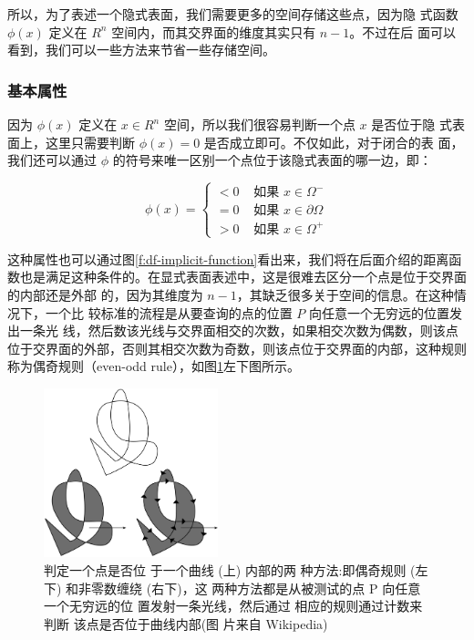 所以，为了表述一个隐式表面，我们需要更多的空间存储这些点，因为隐 式函数 $\phi({x})$ 定义在 $R^{n}$ 空间内，而其交界面的维度其实只有 $n − 1$。不过在后 面可以看到，我们可以一些方法来节省一些存储空间。




\subsubsection{基本属性}
因为 $\phi({x})$ 定义在 ${x} \in R^{n}$ 空间，所以我们很容易判断一个点 ${x}$ 是否位于隐 式表面上，这里只需要判断 $\phi({x}) = 0$ 是否成立即可。不仅如此，对于闭合的表 面，我们还可以通过 $\phi$ 的符号来唯一区别一个点位于该隐式表面的哪一边，即：

\begin{equation}
	\phi({x})=\begin{cases}
		<0 & \text{~如果~} {x}\in\Omega^{-}\\
		=0 & \text{~如果~} {x}\in\partial\Omega\\
		>0 & \text{~如果~} {x}\in\Omega^{+}
	\end{cases}
\end{equation}

这种属性也可以通过图\ref{f:df-implicit-function}看出来，我们将在后面介绍的距离函数也是满足这种条件的。在显式表面表述中，这是很难去区分一个点是位于交界面的内部还是外部 的，因为其维度为 $n − 1$，其缺乏很多关于空间的信息。在这种情况下，一个比 较标准的流程是从要查询的点的位置 $P$ 向任意一个无穷远的位置发出一条光 线，然后数该光线与交界面相交的次数，如果相交次数为偶数，则该点位于交界面的外部，否则其相交次数为奇数，则该点位于交界面的内部，这种规则称为偶奇规则（even-odd rule），如图\ref{f:df-non-zero_winding}左下图所示。

\begin{figure}
	\sidecaption
	\includegraphics[width=0.45\textwidth]{figures/df/Even-odd_and_non-zero_winding_fill_rules}
	\caption{判定一个点是否位 于一个曲线 (上) 内部的两 种方法:即偶奇规则 (左下) 和非零数缠绕 (右下)，这 两种方法都是从被测试的点 P 向任意一个无穷远的位 置发射一条光线，然后通过 相应的规则通过计数来判断 该点是否位于曲线内部(图 片来自 Wikipedia)}
	\label{f:df-non-zero_winding}
\end{figure}

